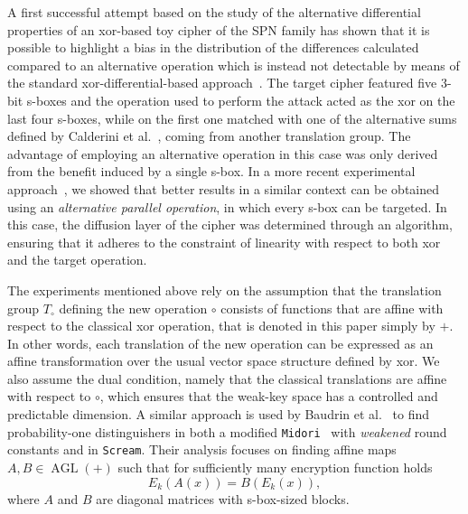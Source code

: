 \documentclass[runningheads,a4paper,english]{llncs}
\DeclareMathOperator{\AGL}{AGL}
\begin{document}
A first successful attempt based on the study of the alternative differential properties of an xor-based toy cipher of the SPN family has shown that it is possible to highlight a bias in the distribution of the differences calculated compared to an alternative operation  which is instead not detectable by means of the standard xor-differential-based approach~\cite{civino2019differential}. The target cipher featured five 3-bit s-boxes and the operation used to perform the attack acted as the xor on the last four s-boxes, while on the first one matched with one of
the alternative sums defined by Calderini et al.~\cite{calderini2021properties}, coming from another translation group. The advantage of employing an alternative operation in this case was only derived from the benefit induced by a single s-box.
In a more recent experimental approach~\cite{nexexp}, we showed that better results in a similar context can be obtained using an \emph{alternative parallel operation}, in which every s-box can be targeted. In this case, the diffusion layer of the cipher was determined through an algorithm, ensuring that it adheres to the constraint of linearity with respect to both xor and the target operation.

The experiments mentioned above rely on the assumption that the translation group $T_\circ$ defining the new operation $\circ$ consists of functions that are affine with respect to the classical xor operation, that is denoted in this paper simply by $+$. In other words, each translation of the new operation can be expressed as an affine transformation over the usual vector space structure defined by xor. We also assume the dual condition, namely that the classical translations are affine with respect to $\circ$, which ensures that the weak-key space has a controlled and predictable dimension.
A similar approach is used by Baudrin et al.~\cite{baudrin2023commutative} to find probability-one distinguishers in both a modified \texttt{Midori}~\cite{banik2015midori} with \emph{weakened} round constants and in \texttt{Scream}. 
Their analysis focuses on finding affine maps $A,B \in \AGL(+)$ such that for sufficiently many encryption function holds 
\[
E_k(A(x)) = B(E_k(x)),
\] 
where $A$ and $B$ are diagonal matrices with s-box-sized blocks. 

\end{document}
